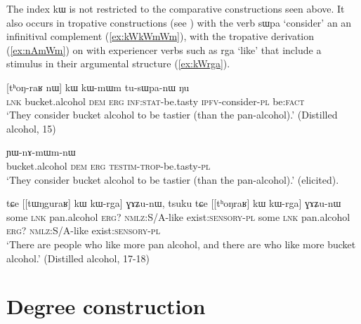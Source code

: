 \documentclass[oldfontcommands,oneside,a4paper,11pt]{article}
\newcommand{\ipa}[1]{{\phon #1}} %
\begin{document}
 
The index \ipa{kɯ} is not restricted to the comparative constructions seen above. It also occurs in  tropative constructions (see \citealt{jacques13tropative}) with the verb \ipa{sɯpa} `consider' an an infinitival complement (\ref{ex:kWkWmWm}), with the tropative derivation (\ref{ex:nAmWm}) on with experiencer verbs such as \ipa{rga} `like' that include  a stimulus in their argumental structure (\ref{ex:kWrga}).

\begin{exe}
\ex \label{ex:kWkWmWm}
\gll  \ipa{tɕe}   [\ipa{tʰoŋ-raʁ}   	\ipa{nɯ}]   	\ipa{kɯ}   	\ipa{kɯ-mɯm}   	\ipa{tu-sɯpa-nɯ}   	\ipa{ŋu}   \\
\textsc{lnk} bucket.alcohol \textsc{dem} \textsc{erg} \textsc{inf:stat}-be.tasty \textsc{ipfv}-consider-\textsc{pl} be:\textsc{fact} \\
\glt `They consider  bucket alcohol to be tastier (than the pan-alcohol).' (Distilled alcohol, 15)
\end{exe}

\begin{exe}
\ex \label{ex:nAmWm}
\gll  [\ipa{tʰoŋraʁ} 	\ipa{nɯ}] 	\ipa{kɯ} 	\ipa{ɲɯ-nɤ-mɯm-nɯ} \\
 bucket.alcohol \textsc{dem} \textsc{erg}  \textsc{testim-trop}-be.tasty-\textsc{pl} \\
 \glt `They consider  bucket alcohol to be tastier (than the pan-alcohol).'  (elicited).
\end{exe}

\begin{exe}
\ex \label{ex:kWrga}
\gll \ipa{tsuku}   	\ipa{tɕe}   	 [[\ipa{tɯŋguraʁ}]   	\ipa{kɯ}   	\ipa{kɯ-rga}]   	\ipa{ɣɤʑu-nɯ,}   		\ipa{tsuku}   	\ipa{tɕe}   	[[\ipa{tʰoŋraʁ}]   	\ipa{kɯ}   	\ipa{kɯ-rga}]   	\ipa{ɣɤʑu-nɯ}   \\
some \textsc{lnk} pan.alcohol \textsc{erg?} \textsc{nmlz:S/A}-like exist\textsc{:sensory}-\textsc{pl} some \textsc{lnk} pan.alcohol \textsc{erg?} \textsc{nmlz:S/A}-like exist\textsc{:sensory}-\textsc{pl} \\
\glt `There are people who like more pan alcohol, and there are who like more bucket alcohol.' (Distilled alcohol, 17-18)
\end{exe}


%
 
\section{Degree construction} \label{sec:degree}
 
\end{document}
